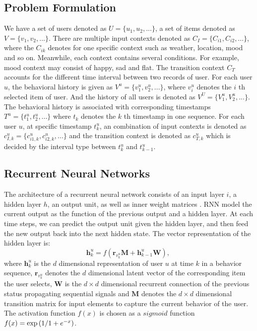\documentclass[conference]{IEEEtran}
\begin{document}
\subsection{Problem Formulation}
We have a set of users denoted as $U  = \{ u_1 ,u_2 ,...\}$, a set of items denoted as $V  = \{ v_1 ,v_2 ,...\}$. There are multiple input contexts denoted as $C_I = \{C_{i1} ,C_{i2} ,...\}$, where the $C_{ik}$ denotes for one specific context such as weather, location, mood and so on. Meanwhile, each context contains several conditions. For example, mood context may consist of happy, sad and flat. The transition context $C_T$ accounts for the different time interval between two records of user. For each user $u$, the behavioral history is given as $V^u = \{v^u_{1}, v^u_{2}, ...\}$, where $v^u_{i}$ denotes the $i$ th selected item of user. And the history of all users is denoted as $V^U = \{V^u_{1}, V^u_{2}, ...\}$. The behavioral history is associated with corresponding timestamps $T^u = \{t^u_{1}, t^u_{2}, ...\}$ where $t_k$ denotes the $k$ th timestamp in one sequence. For each user $u$, at specific timestamp $t_k^u$, an combination of input contexts is denoted as $c_{I,k}^{u} = \{
c_{i1,k}^{u},c_{i2,k}^{u},...\}$ and the transition context is denoted as $c_{T,k}^{u}$ which is decided by the interval type between $t_k^u$ and $t_{k-1}^u$.






\subsection{ Recurrent Neural Networks}
The architecture of a recurrent neural network consists of an input layer $i$, a hidden layer $h$, an output unit, as well as inner weight matrices \cite{zhang2014sequential}. RNN model the current output as the function of the previous output and a hidden layer. At each time steps, we can predict the output unit given the hidden layer, and then feed the new output back into the next hidden state. The vector representation of the hidden layer is:
\begin{equation}  \label{eqHoriginal}
\mathbf{h}_{k}^{u}=f\left ( {\mathbf{r}_{v_{k}^{u}}}\mathbf{M}+\mathbf{h}_{k-1}^{u}\mathbf{W} \right),~
\end{equation}
where $\mathbf{h}^u_{k}$ is the $d$ dimensional representation of  user $u$ at time $k$ in a behavior sequence, $\mathbf{r}_{v_{k}^{u}}$ denotes the $d$ dimensional latent vector of the corresponding item the user selects, $\mathbf{W}$ is the $d \times d$ dimensional recurrent connection of the previous status propagating sequential signals and $\mathbf{M}$ denotes the $d \times d$ dimensional transition matrix for input elements to capture the current behavior of the user. The activation function $f(x)$ is chosen as a $sigmoid$ function $f(x) = \exp \left( {1 \mathord{\left/ \right. \kern-\nulldelimiterspace} 1 + e^{ - x} } \right)$.
\end{document}
